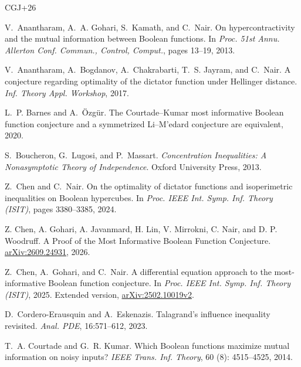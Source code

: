 \documentclass[11pt,letterpaper]{amsart}
\newcommand{\1}{\mathbf 1}
\numberwithin{equation}{section}
\begin{document}
\begin{thebibliography}{CGJ+26}
\setlength{\itemsep}{0.2em}


V.~Anantharam, A.~A. Gohari, S.~Kamath, and C.~Nair.
\newblock On hypercontractivity and the mutual information between {Boolean} functions.
\newblock In \emph{Proc. 51st Annu. Allerton Conf. Commun., Control, Comput.}, pages 13--19, 2013.

V.~Anantharam, A.~Bogdanov, A.~Chakrabarti, T.~S. Jayram, and C.~Nair.
\newblock A conjecture regarding optimality of the dictator function under {Hellinger} distance.
\newblock \emph{Inf. Theory Appl. Workshop}, 2017.

L.~P. Barnes and A.~\"Ozg\"ur.
\newblock The {Courtade--Kumar} most informative {Boolean} function conjecture
and a symmetrized {Li--M'edard} conjecture are equivalent, 2020.

S.~Boucheron, G.~Lugosi, and P.~Massart.
\newblock \emph{Concentration Inequalities:
A Nonasymptotic Theory of Independence}.
\newblock Oxford University Press, 2013.

Z.~Chen and C.~Nair.
\newblock On the optimality of dictator functions and isoperimetric inequalities on {Boolean} hypercubes.
\newblock In \emph{Proc. IEEE Int. Symp. Inf. Theory (ISIT)}, pages 3380--3385, 2024.

Z. Chen, A. Gohari, A. Javanmard, H. Lin, V. Mirrokni, C. Nair, and D. P. Woodruff.
\newblock A Proof of the Most Informative Boolean Function Conjecture. 
\newblock \href{https://arxiv.org/abs/2609.24931}{arXiv:2609.24931}, 2026.

Z.~Chen, A.~Gohari, and C.~Nair.
\newblock A differential equation approach to the most-informative {Boolean}
function conjecture.
\newblock In \emph{Proc. IEEE Int. Symp. Inf. Theory (ISIT)}, 2025.
\newblock Extended version,
\href{https://arxiv.org/abs/2502.10019v2}{arXiv:2502.10019v2}.


 D.~Cordero-Erausquin and A.~Eskenazis.
\newblock Talagrand's influence inequality revisited.
\newblock \emph{Anal. PDE}, 16:571--612, 2023.

T.~A. Courtade and G.~R. Kumar.
\newblock Which {Boolean} functions maximize mutual information on noisy
inputs?
\newblock \emph{IEEE Trans. Inf. Theory}, 60
(8): 4515--4525, 2014.


\end{thebibliography}
\end{document}
